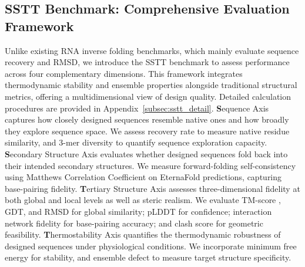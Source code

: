 

\subsection{SSTT Benchmark: Comprehensive Evaluation Framework}
\label{subsec:sstt}

Unlike existing RNA inverse folding benchmarks, which mainly evaluate sequence recovery and RMSD, we introduce the SSTT benchmark to assess performance across four complementary dimensions. This framework integrates thermodynamic stability and ensemble properties alongside traditional structural metrics, offering a multidimensional view of design quality. Detailed calculation procedures are provided in Appendix~\ref{subsec:sstt_detail}. 
{\textbf{S}equence Axis} captures how closely designed sequences resemble native ones and how broadly they explore sequence space. We assess recovery rate \citep{dauparas2022proteinmpnn} to measure native residue similarity, and 3-mer diversity \citep{shannon1948mathematical,Bokulich2024diversitykmer} to quantify sequence exploration capacity.
{\textbf{S}econdary Structure Axis} evaluates whether designed sequences fold back into their intended secondary structures. We measure forward-folding self-consistency using Matthews Correlation Coefficient \citep{matthews1975comparison,mccmoreaccurate} on EternaFold \citep{waymentsteele2022eternafold} predictions, capturing base-pairing fidelity. 
{\textbf{T}ertiary Structure Axis} assesses three-dimensional fidelity at both global and local levels as well as steric realism. We evaluate TM-score \citep{zhang2004tmscore}, GDT, and RMSD for global similarity; pLDDT \citep{jumper2021alphafold2} for confidence; { interaction network fidelity \citep{parisien2009newmetricsinf} for base-pairing accuracy; and clash score \citep{word1999clashscore,davis2007molprobity} for geometric feasibility.} 
{\textbf{T}hermostability Axis} quantifies the thermodynamic robustness of designed sequences under physiological conditions. We incorporate minimum free energy \citep{zuker1981optimal} for stability, { and ensemble defect \citep{zadeh2011nucleic} to measure target structure specificity.}